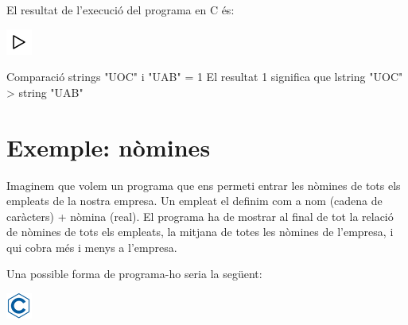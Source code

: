 \documentclass[
]{book}
\newenvironment{Shaded}{\begin{snugshade}}{\end{snugshade}}
\newcommand{\DecValTok}[1]{\textcolor[rgb]{0.00,0.00,0.81}{#1}}
\newcommand{\NormalTok}[1]{#1}
\newcommand{\StringTok}[1]{\textcolor[rgb]{0.31,0.60,0.02}{#1}}
\begin{document}
El resultat de l'execució del programa en C és:

\includegraphics{./img/play.png}

\begin{Shaded}
\begin{Highlighting}[]
\NormalTok{Comparació strings }\StringTok{"UOC"}\NormalTok{ i }\StringTok{"UAB"}\NormalTok{ = }\DecValTok{1}
\NormalTok{El resultat }\DecValTok{1}\NormalTok{ significa que l\textquotesingle{}string }\StringTok{"UOC"}\NormalTok{ \textgreater{} string }\StringTok{"UAB"}
\end{Highlighting}
\end{Shaded}

\hypertarget{exemple-nuxf2mines}{%
\section{Exemple: nòmines}\label{exemple-nuxf2mines}}

Imaginem que volem un programa que ens permeti entrar les nòmines de tots els empleats de la nostra empresa. Un empleat el definim com a nom (cadena de caràcters) + nòmina (real). El programa ha de mostrar al final de tot la relació de nòmines de tots els empleats, la mitjana de totes les nòmines de l'empresa, i qui cobra més i menys a l'empresa.

Una possible forma de programa-ho seria la següent:

\includegraphics{./img/c.png}
\end{document}
